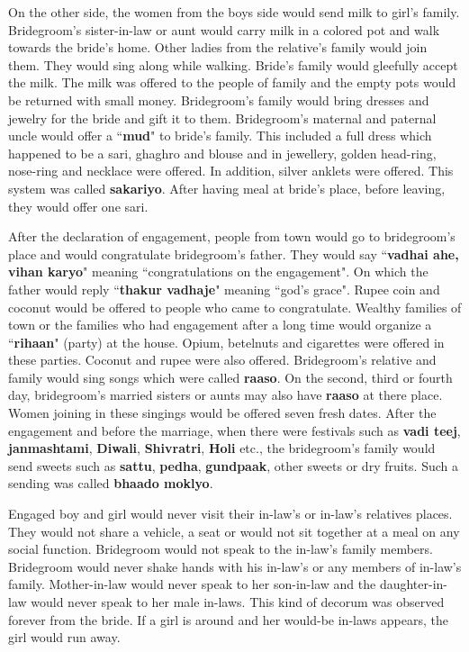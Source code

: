 On the other side, the women from the boys side would send milk to girl's
family. Bridegroom's sister-in-law or aunt would carry milk in a colored pot and
walk towards the bride's home. Other ladies from the relative's family would
join them. They would sing along while walking. Bride's family would gleefully
accept the milk. The milk was offered to the people of family and the empty
pots would be returned with small money. Bridegroom's family would bring dresses and
jewelry for the bride and gift it to them. Bridegroom's maternal and paternal uncle
would offer a ``\textbf{mud}" to bride's family. This included a full dress
which happened to be a sari, ghaghro and blouse and in jewellery, golden
head-ring, nose-ring and necklace were offered. In addition, silver anklets
were offered. This system was called \textbf{sakariyo}. After having meal at
bride's place, before leaving, they would offer one sari.

After the declaration of engagement, people from town would go to bridegroom's place
and would congratulate bridegroom's father. They would say ``\textbf{vadhai ahe,
vihan karyo}" meaning ``congratulations on the engagement". On which the father
would reply ``\textbf{thakur vadhaje}" meaning ``god's grace". Rupee coin and
coconut would be offered to people who came to congratulate. Wealthy families
of town or the families who had engagement after a long time would organize a
``\textbf{rihaan}" (party) at the house. Opium, betelnuts and cigarettes were
offered in these parties. Coconut and rupee were also offered. Bridegroom's relative
and family would sing songs which were called \textbf{raaso}. On the second,
third or fourth day, bridegroom's married sisters or aunts may also have
\textbf{raaso} at there place. Women joining in these singings would be offered
seven fresh dates. After the engagement and before the marriage, when there
were festivals such as \textbf{vadi teej}, \textbf{janmashtami},
\textbf{Diwali}, \textbf{Shivratri}, \textbf{Holi} etc., the bridegroom's family
would send sweets such as \textbf{sattu}, \textbf{pedha}, \textbf{gundpaak},
other sweets or dry fruits. Such a sending was called \textbf{bhaado moklyo}.

Engaged boy and girl would never visit their in-law's or in-law's relatives
places. They would not share a vehicle, a seat or would not sit together at a
meal on any social function. Bridegroom would not speak to the in-law's family
members. Bridegroom would never shake hands with his in-law's or any members of
in-law's family. Mother-in-law would never speak to her son-in-law and the
daughter-in-law would never speak to her male in-laws. This kind of decorum was
observed forever from the bride. If a girl is around and her would-be in-laws
appears, the girl would run away.

